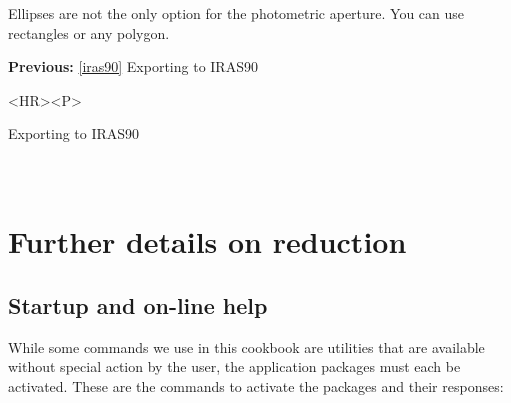 \begin{latexonly}
\begin{center}
\leavevmode\epsfysize=80mm
\end{center}
\end{latexonly}

   Ellipses are not the only option for the photometric aperture. You
   can use rectangles or any polygon.

\begin{latexonly}
{\bf Previous:} \ref{iras90} Exporting to IRAS90\\
\end{latexonly}

\begin{htmlonly}
\begin{rawhtml} <HR><P> \end{rawhtml}
{\bf {}} Exporting to IRAS90\\
{\bf {}}\\
{\bf {}}\\
\end{htmlonly}


\newpage
\section{Further details on reduction}

\subsection{\label{start2}Startup and on-line help}

   While some commands we use in this cookbook are utilities that are
   available without special action by the user, the application packages
   must each be activated. These are the commands to activate the
   packages
 and their responses:

